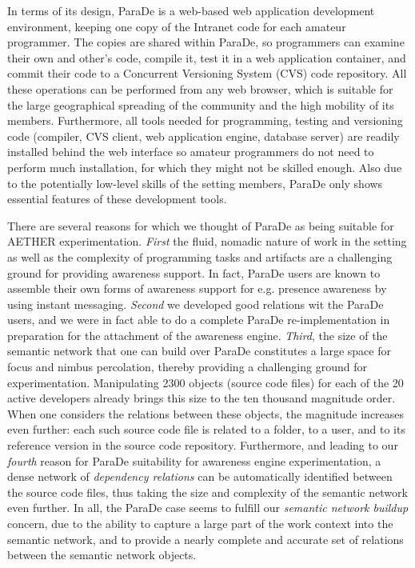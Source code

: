 \documentclass{ecscw2007}
\begin{document}
In terms of its design, ParaDe is a web-based web application development environment, keeping one copy of the Intranet code for each amateur programmer. The copies are shared within ParaDe, so programmers can examine their own and other's code, compile it, test it in a web application container, and commit their code to a Concurrent Versioning System (CVS) code repository. All these operations can be performed from any web browser, which is suitable for the large geographical spreading of the community and the high mobility of its members. Furthermore, all tools needed for programming, testing and versioning code (compiler, CVS client, web application engine, database server) are readily installed behind the web interface so amateur programmers do not need to perform much installation, for which they might not be skilled enough. Also due to the potentially low-level skills of the setting members, ParaDe only shows essential features of these development tools.

There are several reasons for which we thought of ParaDe as being suitable for AETHER experimentation. \textit{First} the fluid, nomadic nature of work in the setting as well as the complexity of programming tasks and artifacts are a challenging ground for providing awareness support. In fact, ParaDe users are known to assemble their own forms of awareness support for e.g. presence awareness by using instant messaging.
 \textit{Second} we developed good relations wit the ParaDe users, and we were in fact able to do a complete ParaDe re-implementation in preparation for the attachment of the awareness engine. 
 \textit{Third}, the size of the semantic network that one can build over ParaDe constitutes a large space for focus and nimbus percolation, thereby providing a challenging ground for experimentation. Manipulating 2300 objects (source code files) for each of the 20 active developers already brings this size to the ten thousand magnitude order. When one considers the relations between these objects, the magnitude increases even further: each such source code file is related to a folder, to a user, and to its reference version in the source code repository. 
 Furthermore, and leading to our \textit{fourth} reason for ParaDe suitability for awareness engine experimentation, a dense network of \textit{dependency relations} can be automatically identified between the source code files, thus taking the size and complexity of the semantic network even further. In all, the ParaDe case seems to fulfill our \textit{semantic network buildup} concern, due to the ability to capture a large part of the work context into the semantic network, and to provide a nearly complete and accurate set of relations between the semantic network objects. 
\end{document}

